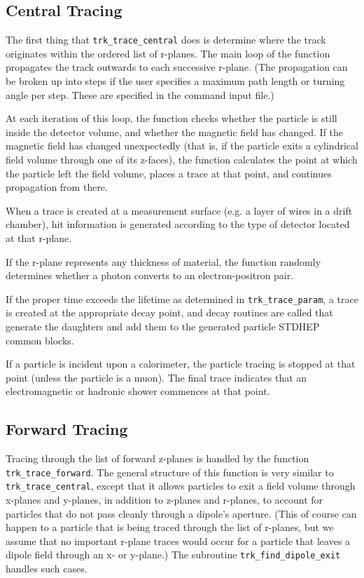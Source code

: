 \subsection{Central Tracing}

The first thing that \verb'trk_trace_central' does is determine where the
track originates within the ordered list of r-planes.  The main loop of the
function propagates the track outwards to each successive r-plane.  (The
propagation can be broken up into steps if the user specifies a maximum
path length or turning angle per step.  These are specified in the command
input file.)

At each iteration of this loop, the function checks whether the particle is
still inside the detector volume, and whether the magnetic field has changed.
If the magnetic field has changed unexpectedly (that is, if the particle
exits a cylindrical field volume through one of its z-faces), the function
calculates the point at which the particle left the field volume, places a
trace at that point, and continues propagation from there.

When a trace is created at a measurement surface (e.g. a layer of wires in a
drift chamber), hit information is generated according to the type of
detector located at that r-plane.

If the r-plane represents any thickness of material, the function randomly
determines whether a photon converts to an electron-positron pair.

If the proper time exceeds the lifetime as determined in
\verb'trk_trace_param', a trace is created at the appropriate decay point, and
decay routines are called that generate the daughters and add them to the
generated particle STDHEP common blocks.

If a particle is incident upon a calorimeter, the particle tracing is stopped
at that point (unless the particle is a muon).  The final trace indicates
that an electromagnetic or hadronic shower commences at that point.

\subsection{Forward Tracing}

Tracing through the list of forward z-planes is handled by the function
\verb'trk_trace_forward'.  The general structure of this function is very
similar to \verb'trk_trace_central', except that it allows particles to
exit a field volume through x-planes and y-planes, in addition to z-planes
and r-planes, to account for particles that do not pass cleanly through
a dipole's aperture.  (This of course can happen to a particle that is
being traced through the list of r-planes, but we assume that no
important r-plane traces would occur for a particle that leaves a dipole
field through an x- or y-plane.)  The subroutine \verb'trk_find_dipole_exit'
handles such cases.

